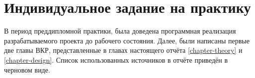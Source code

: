\chapter{Индивидуальное задание на практику}

В период преддипломной практики, была доведена программная реализация разрабатываемого проекта до рабочего состояния.
Далее, были написаны первые две главы ВКР, представленные в главах настоящего отчёта \ref{chapter-theory} и \ref{chapter-design}.
Список использованных источников в отчёте приведён в черновом виде.
